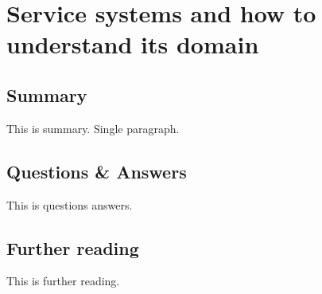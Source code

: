 \section{Service systems and how to understand its domain}

\subsection{Summary}
This is summary. Single paragraph.

\subsection{Questions \& Answers}
This is questions answers.

\subsection{Further reading}
This is further reading.
